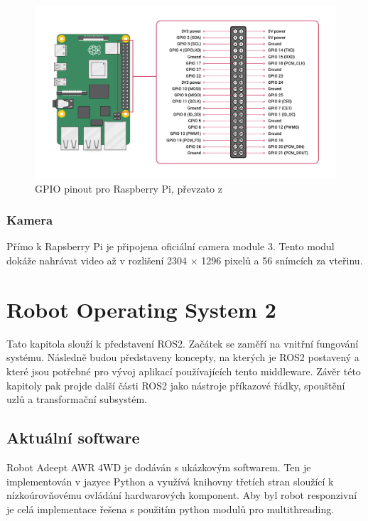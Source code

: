 \begin{figure}[h!]
	\centering
	\includegraphics[scale=0.15]{obrazky-figures/gpio_pinout.png}
	\caption[GPIO pinout pro Raspberry Pi]{GPIO pinout pro Raspberry Pi, převzato z \cite{rpi_documentation}}
	\label{fig:rpi_gpio_pinout}
\end{figure}

\subsection*{Kamera}
Přímo k Rapsberry Pi je připojena oficiální camera module 3. Tento modul dokáže nahrávat video až v rozlišení 2304 × 1296 pixelů a 56 snímcích za vteřinu. \cite{rpi_documentation}

\chapter{Robot Operating System 2}
Tato kapitola slouží k představení ROS2. Začátek se zaměří na vnitřní fungování systému. Následně budou představeny koncepty, na kterých je ROS2 postavený a které jsou potřebné pro vývoj aplikací používajících tento middleware. Závěr této kapitoly pak projde další části ROS2 jako nástroje příkazové řádky, spouštění uzlů a transformační subsystém.

\section{Aktuální software}
Robot Adeept AWR 4WD je dodáván s ukázkovým softwarem. Ten je implementován v jazyce Python a využívá knihovny třetích stran sloužící k nízkoúrovňovému ovládání hardwarových komponent. Aby byl robot responzivní je celá implementace řešena s použitím python modulů pro multithreading.

